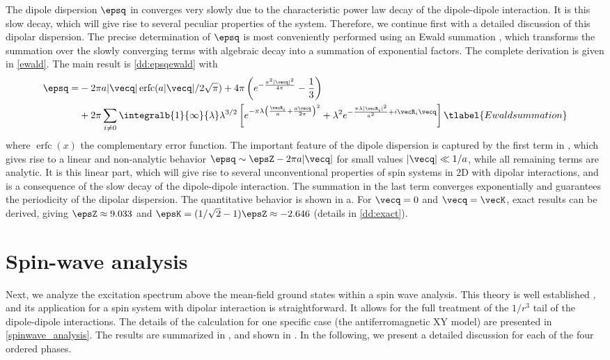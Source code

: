 The dipole dispersion $\epsq$ in 
converges very slowly due to the characteristic power law decay of the dipole-dipole
interaction. It is this slow decay, which will give rise to several peculiar
properties of the system. Therefore, we continue first with a detailed discussion
of this dipolar dispersion. The precise determination of $\epsq$ is
most conveniently performed using an Ewald summation \cite{Bonsall1977,Muller2010}, which transforms
the summation over the slowly converging terms with algebraic decay into a summation of exponential factors.
The complete derivation is given in \cref{ewald}. The main result is \cref{dd:epsqewald} with
%
\begin{align}
    \epsq   = &- 2 \pi a | {\vecq}|\operatorname{erfc}(a |{\vecq}|/2\sqrt{\pi})   + 4 \pi \left( e^{- \frac{a^2 |{\vecq}|^2}{4 \pi}} - \frac{1}{3}\right)
\\
   & +     2 \pi \sum_{i\neq 0} \integralb{1}{\infty}{\lambda} \lambda^{3/2} \left[ e^{- \pi  \lambda \left(\frac{ {\vecR}_{i}}{a} + \frac{a {\vecq}}{2 \pi}\right)^2} +\lambda^{2}  e^{- \frac{\pi \lambda |{\vecR}_{i}|^2}{a^2}+ i {\vecR}_{i}{\vecq}}\right]\tlabel{Ewaldsummation}
\end{align}
%
where $\operatorname{erfc}(x)$ the complementary error function. The important feature of the dipole
dispersion is captured by the first term in , which
gives rise to a linear and non-analytic behavior $\epsq \sim
\epsZ - 2 \pi a |\vecq|$ for small values $|\vecq| \ll 1/a $, while all
remaining terms are analytic. It is this linear part, which will give rise to
several unconventional properties of spin systems in 2D with dipolar
interactions, and is a consequence of the slow decay of the dipole-dipole
interaction. The summation in the last term converges exponentially and
guarantees the periodicity of the dipolar dispersion. The quantitative behavior
is shown in a. For $\vecq=0$ and $\vecq=\vecK$, exact results can be derived,
giving $\epsZ\approx 9.033$ and $\epsK=(1/\sqrt{2}-1) \epsZ \approx -2.646$ (details in \cref{dd:exact}).


\section{Spin-wave analysis}

Next, we analyze the excitation spectrum above the mean-field ground states
within a spin wave analysis. This theory is well
established \cite{Kubo1952,Auerbach1994}, and its application for a spin system with dipolar
interaction is straightforward.
It allows for the full treatment of the $1/r^3$ tail of the dipole-dipole interactions.
The details of the calculation for one specific case (the
antiferromagnetic XY model) are presented in \cref{spinwave_analysis}. The results are
summarized in , and shown in . In the following, we present a detailed
discussion for each of the four ordered phases.

